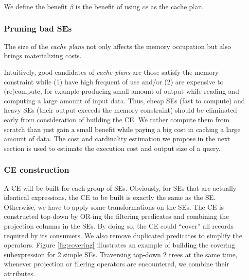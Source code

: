 We define the benefit $\beta$ is the benefit of using $ce$ as the cache plan. 

\subsubsection{Pruning bad SEs}
\label{sec:se-prune}
The size of the \emph{cache plans} not only affects the memory occupation but also brings materializing costs. 


Intuitively, good candidates of \emph{cache plans} are those satisfy the memory constraint while (1) have high frequent of use and/or (2) are expensive to (re)compute, for example producing small amount of output while reading and computing a large amount of input data. Thus, cheap SEs (fast to compute) and heavy SEs (their output exceeds the memory constraint) should be eliminated early from consideration of building the CE. We rather compute them from scratch than just gain a small benefit while paying a big cost in caching a large amount of data. The cost and cardinality estimation we propose in the next section is used to estimate the execution cost and output size of a query.





\subsubsection{CE construction}
\label{sec:ce-construction}
A CE will be built for each group of SEs. Obviously, for SEs that are actually identical expressions, the CE to be built is exactly the same as the SE. Otherwise, we have to apply some transformations on the SEs. The CE is constructed top-down by OR-ing the filtering predicates and combining the projection columns in the SEs. By doing so, the CE could ``cover'' all records required by its consumers. We also remove duplicated predicates to simplify the operators. Figure \ref{fig:covering} illustrates an example of building the covering subexpression for 2 simple SEs. Traversing top-down 2 trees at the same time, whenever projection or filering operators are encountered, we combine their attributes.

